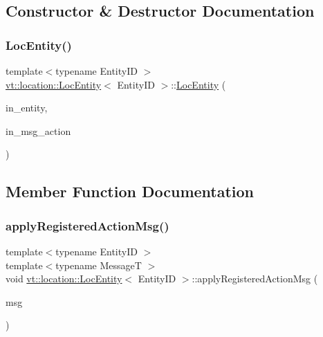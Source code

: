 \subsection{Constructor \& Destructor Documentation}
\mbox{\label{structvt_1_1location_1_1_loc_entity_a41d90430d63f4e299e1c888fcf9d3238}} 
\subsubsection{\texorpdfstring{Loc\+Entity()}{LocEntity()}}
{\footnotesize\ttfamily template$<$typename Entity\+ID $>$ \\
\hyperlink{structvt_1_1location_1_1_loc_entity}{vt\+::location\+::\+Loc\+Entity}$<$ Entity\+ID $>$\+::\hyperlink{structvt_1_1location_1_1_loc_entity}{Loc\+Entity} (\begin{DoxyParamCaption}\item[{Entity\+ID const \&}]{in\+\_\+entity,  }\item[{\hyperlink{namespacevt_1_1location_ad0a130e4d79e745543925240e13e8f08}{Loc\+Msg\+Action\+Type}}]{in\+\_\+msg\+\_\+action }\end{DoxyParamCaption})\hspace{0.3cm}{\ttfamily [inline]}}



\subsection{Member Function Documentation}
\mbox{\label{structvt_1_1location_1_1_loc_entity_a7675dd0ee13bc5b759b6a4313d521e04}} 
\subsubsection{\texorpdfstring{apply\+Registered\+Action\+Msg()}{applyRegisteredActionMsg()}}
{\footnotesize\ttfamily template$<$typename Entity\+ID $>$ \\
template$<$typename MessageT $>$ \\
void \hyperlink{structvt_1_1location_1_1_loc_entity}{vt\+::location\+::\+Loc\+Entity}$<$ Entity\+ID $>$\+::apply\+Registered\+Action\+Msg (\begin{DoxyParamCaption}\item[{MessageT $\ast$}]{msg }\end{DoxyParamCaption})\hspace{0.3cm}{\ttfamily [inline]}}



